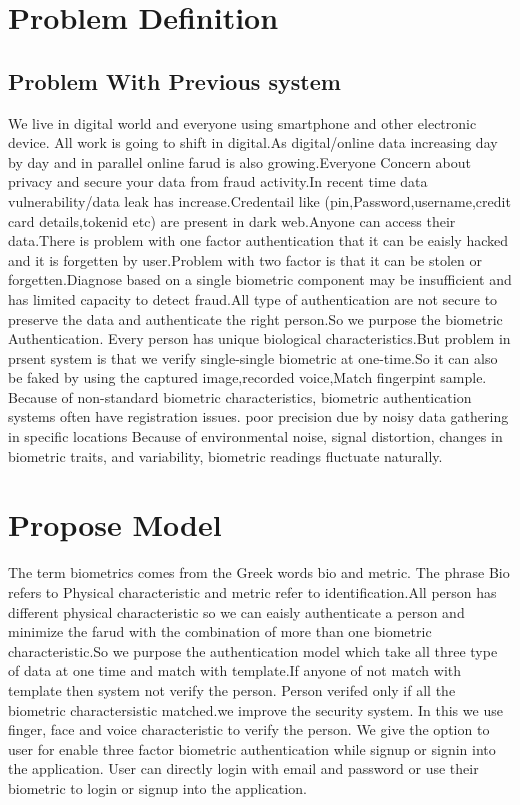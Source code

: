 \documentclass[conference]{IEEEtran}
\begin{document}
\section{Problem Definition}

\subsection{Problem With Previous system}

We live in digital world and everyone using smartphone and other electronic device. All work is going to
shift in digital.As digital/online data increasing day by day and in parallel online farud is also
growing.Everyone Concern about privacy and secure your data from fraud activity.In recent time data vulnerability/data leak has increase.Credentail like
(pin,Password,username,credit card details,tokenid etc) are present in dark web.Anyone can access
their data.There is problem with one factor authentication that it can be eaisly hacked and it is forgetten by user.Problem with two factor is that it can be stolen or forgetten.Diagnose based on a single biometric component may be insufficient and has limited capacity to detect fraud.All type of authentication are not secure to preserve the data and authenticate the right person.So we purpose the biometric Authentication. Every person has unique biological characteristics.But problem in prsent system is that we verify single-single biometric at one-time.So
it can also be faked by using the captured image,recorded voice,Match fingerpint sample. Because of non-standard biometric characteristics, biometric authentication systems often have registration issues. poor precision due by noisy data gathering in specific locations Because of environmental noise, signal distortion, changes in biometric traits, and variability, biometric readings fluctuate naturally.
\section{Propose Model}

The term biometrics comes from the Greek words bio and metric. The phrase Bio refers to Physical characteristic and metric refer to identification.All person has different physical characteristic so we can eaisly authenticate a person and minimize the farud with the combination of more than one biometric characteristic.So we
purpose the authentication model which take all three type of data at one time and match with template.If anyone of not match with template then system not verify the person. Person verifed
only if all the biometric charactersistic matched.we improve the security system. In this we use finger, face and voice characteristic to verify the person. We give the option to user for enable three factor biometric authentication while signup or signin into the application. User can directly login with email and password or use their biometric to login or signup into the application.
\end{document}
